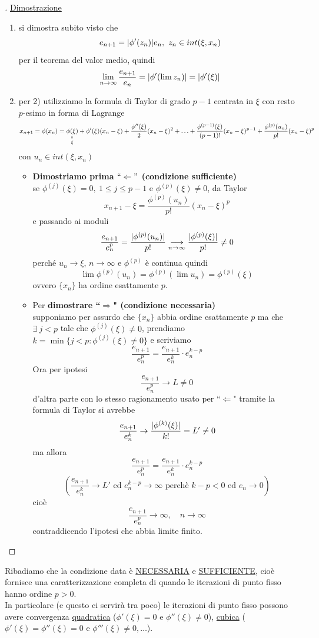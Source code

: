 \documentclass[12pt]{article}
\DeclarePairedDelimiter{\abs}{\lvert}{\rvert}
\begin{document}
\begin{proof}[\unskip\nopunct]
\uline{Dimostrazione}
\begin{enumerate}
    \item si dimostra subito visto che 
        \[e_{n+1}=\abs{\phi'(z_n)}e_n, \ z_n \in int(\xi,x_n)\]
        per il teorema del valor medio, quindi 
        \[\lim_{n\to\infty} \frac{e_{n+1}}{e_n} = \abs{\phi'(\lim z_n)}=\abs{\phi'(\xi)}\]
    \item per 2) utilizziamo la formula di Taylor di grado $p-1$ centrata in $\xi$ con resto $p$-esimo in forma di Lagrange \\
\[x_{n+1}=\phi(x_n)=\underset{\xi}{\underset{\shortparallel}{\phi(\xi)}}+ \phi'(\xi)(x_n-\xi)+\frac{\phi''(\xi)}{2}(x_n-\xi)^2+\dotso+\frac{\phi^{(p-1)}(\xi)}{(p-1)!}(x_n-\xi)^{p-1}+\frac{\phi^{(p)}(u_n)}{p!}(x_n-\xi)^p\]
con $u_n \in int(\xi,x_n)$\\
\begin{itemize}
\item \textbf{Dimostriamo prima $``\Leftarrow"$ (condizione sufficiente)}\\
se $\phi^{(j)}(\xi)=0, \ 1\leq j \leq p-1$ e $\phi^{(p)}(\xi)\neq 0$, da Taylor 
\[x_{n+1}-\xi=\frac{\phi^{(p)}(u_n)}{p!}(x_n-\xi)^p\]
e passando ai moduli
\[\frac{e_{n+1}}{e_n^p}=\frac{\abs{\phi^{(p)}(u_n)}}{p!}\underset{n\to\infty}{\longrightarrow}\frac{\abs{\phi^{(p)}(\xi)}}{p!}\neq 0\]
perché $u_n\rightarrow \xi$, $n\to\infty$ e $\phi^{(p)}$ è continua quindi 
\[\lim \phi^{(p)}(u_n)=\phi^{(p)}(\lim u_n)=\phi^{(p)}(\xi)\]
ovvero $\{x_n\}$ ha ordine esattamente $p$. \\
\item Per \textbf{dimostrare ``$\Rightarrow$" (condizione necessaria)}\\ 
supponiamo per assurdo che $\{ x_n \}$ abbia ordine esattamente $p$ ma che $\exists\ j<p$ tale che $\phi^{(j)}(\xi)\neq 0 $, prendiamo $k=\min\{ j<p:\phi^{(j)}(\xi)\neq0\}$ e scriviamo 
\[\frac{e_{n+1}}{e_n^p} = \frac{e_{n+1}}{e_n^k}\cdot e_n^{k-p}\]
Ora per ipotesi
\[\frac{e_{n+1}}{e_n^p}\rightarrow L \neq 0 \]
d'altra parte con lo stesso ragionamento usato per ``$\Leftarrow$" tramite la formula di Taylor si avrebbe
\[\frac{e_{n+1}}{e_n^k}\to \frac{\abs{\phi^{(k)}(\xi)}}{k!}=L'\neq 0\] 
ma allora
\[\frac{e_{n+1}}{e_n^p} = \frac{e_{n+1}}{e_n^k}\cdot e_n^{k-p}\]
\[\left( \frac{e_{n+1}}{e_n^k} \to L' \text{ ed } e_n^{k-p} \to \infty \text{ perchè } k-p<0 \text{ ed } e_n \to 0 \right) \]
cioè 
\[\frac{e_{n+1}}{e_n^p} \to \infty, \quad n \to \infty\]
contraddicendo l'ipotesi che abbia limite finito.
\end{itemize}
\end{enumerate}
\end{proof}
\bigskip
Ribadiamo che la condizione data è \uline{NECESSARIA} e \uline{SUFFICIENTE}, cioè fornisce una caratterizzazione completa di quando le iterazioni di punto fisso hanno ordine $p>0$.\\
In particolare (e questo ci servirà tra poco) le iterazioni di punto fisso possono avere convergenza \uline{quadratica} ($\phi'(\xi)=0$ e $\phi''(\xi)\ne 0$), \uline{cubica} ($\phi'(\xi)=\phi''(\xi)=0$ e $\phi'''(\xi)\ne0, \dotso$).
\end{document}
